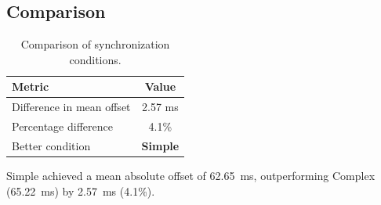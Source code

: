 \subsection*{Comparison}

\begin{table}[h!]
\centering
\begin{tabular}{|l|c|}
\hline
Metric & Value \\
\hline
Difference in mean offset & 2.57 ms \\
Percentage difference & 4.1\% \\
Better condition & \textbf{Simple} \\
\hline
\end{tabular}
\caption{Comparison of synchronization conditions.}
\label{tab:sync_comparison_p1}
\end{table}

Simple achieved a mean absolute offset of 62.65~ms, outperforming Complex (65.22~ms) by 2.57~ms (4.1\%).
